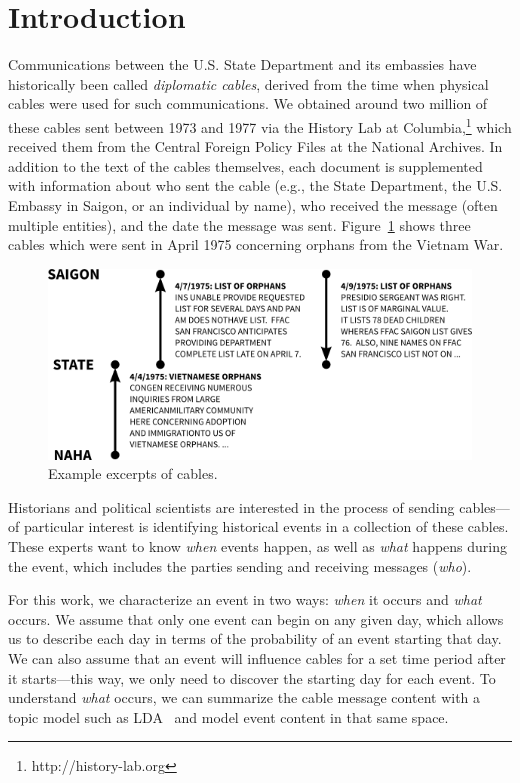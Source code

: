 \section{Introduction}

Communications between the U.S. State Department and its embassies have historically been called \emph{diplomatic cables}, derived from the time when physical cables were used for such communications.
We obtained around two million of these cables sent between 1973 and 1977 via the History Lab at Columbia,\footnote{http://history-lab.org} which received them from the Central Foreign Policy Files at the National Archives.  In addition to the text of the cables themselves, each document is supplemented with information about who sent the cable (e.g., the State Department, the U.S. Embassy in Saigon, or an individual by name), who received the message (often multiple entities), and the date the message was sent.
Figure~\ref{fig:cables_example} shows three cables which were sent in April 1975 concerning orphans from the Vietnam War.


\begin{figure}[ht]
\includegraphics[width=\textwidth]{fig/cables_orphan_example.png}
\caption{Example excerpts of cables.}
\label{fig:cables_example}
\end{figure}

Historians and political scientists are interested in the process of sending cables---of particular interest is identifying historical events in a collection of these cables.  These experts want to know \emph{when} events happen, as well as \emph{what} happens during the event, which includes the parties sending and receiving messages (\emph{who}). 

For this work, we characterize an event in two ways: \emph{when} it occurs and \emph{what} occurs.  We assume that only one event can begin on any given day, which allows us to describe each day in terms of the probability of an event starting that day.  We can also assume that an event will influence cables for a set time period after it starts---this way, we only need to discover the starting day for each event.  
To understand \emph{what} occurs, we can summarize the cable message content with a topic model such as LDA~\citep{Blei:2003} and model event content in that same space.


